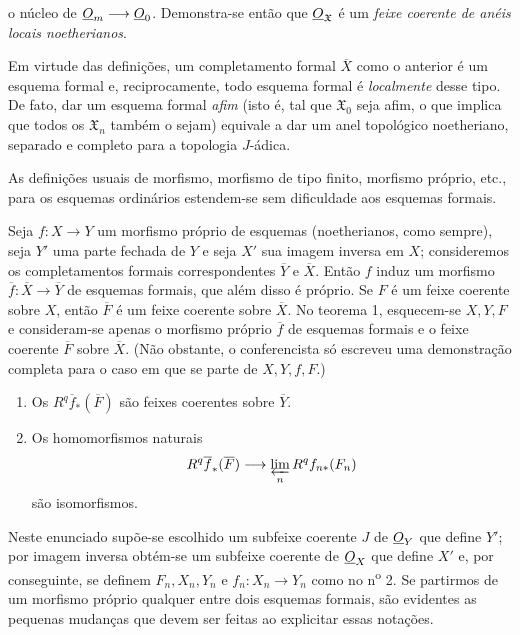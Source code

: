 o núcleo de $\underline{O}_m\longrightarrow\underline{O}_0$. Demonstra-se então que
$\underline{O}_{\mathfrak X}$ é um \emph{feixe coerente de anéis locais
noetherianos}.

Em virtude das definições, um completamento formal $\overline X$ como o
anterior é um esquema formal e, reciprocamente, todo esquema formal é
\emph{localmente} desse tipo. De fato, dar um esquema formal \emph{afim} (isto
é, tal que $\mathfrak X_0$ seja afim, o que implica que todos os
$\mathfrak X_n$ também o sejam) equivale a dar um anel topológico noetheriano,
separado e completo para a topologia $J$-ádica.

As definições usuais de morfismo, morfismo de tipo finito, morfismo
próprio, etc., para os esquemas ordinários estendem-se sem dificuldade aos
esquemas formais.


Seja $f:X\longrightarrow Y$ um morfismo próprio de esquemas (noetherianos, como
sempre), seja $Y'$ uma parte fechada de $Y$ e seja $X'$ sua imagem inversa em
$X$; consideremos os completamentos formais correspondentes $\overline Y$ e
$\overline X$. Então $f$ induz um morfismo
$\overline f:\overline X\longrightarrow\overline Y$ de esquemas formais, que
além disso é próprio. Se $F$ é um feixe coerente sobre $X$, então $\overline F$
é um feixe coerente sobre $\overline X$. No teorema 1, esquecem-se $X,Y,F$ e
consideram-se apenas o morfismo próprio $\overline f$ de esquemas formais e o
feixe coerente $\overline F$ sobre $\overline X$. (Não obstante, o conferencista
só escreveu uma demonstração completa para o caso em que se parte de
$X,Y,f,F$.)

\begin{enumerate}
  \item[\textit{i.}] Os $R^{q}\overline f_{*}(\overline F)$ são feixes
    coerentes sobre $\overline Y$.
  \item[\textit{ii.}] Os homomorfismos naturais
    \[
      R^{q}\overline f_{*}(\overline F)
      \longrightarrow \varprojlim_n R^{q}f_{n*}(F_n)
    \]
    são isomorfismos.
\end{enumerate}

Neste enunciado supõe-se escolhido um subfeixe coerente $J$ de $\underline{O}_Y$ que
define $Y'$; por imagem inversa obtém-se um subfeixe coerente de $\underline{O}_X$ que
define $X'$ e, por conseguinte, se definem $F_n,X_n,Y_n$ e
$f_n:X_n\longrightarrow Y_n$ como no n\textsuperscript{o} 2. Se partirmos de
um morfismo próprio qualquer entre dois esquemas formais, são evidentes as
pequenas mudanças que devem ser feitas ao explicitar essas notações.

